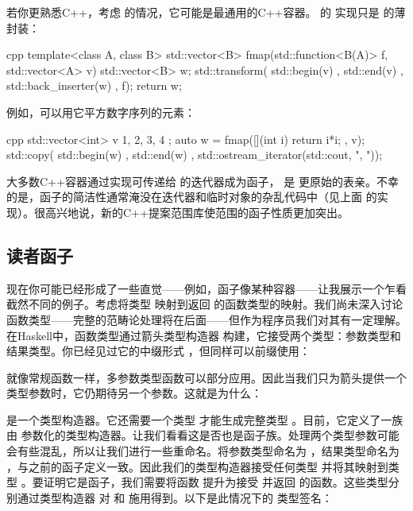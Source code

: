 若你更熟悉C++，考虑  的情况，它可能是最通用的C++容器。 的  实现只是  的薄封装：

\begin{snip}{cpp}
template<class A, class B>
std::vector<B> fmap(std::function<B(A)> f, std::vector<A> v) {
    std::vector<B> w;
    std::transform( std::begin(v)
                  , std::end(v)
                  , std::back_inserter(w)
                  , f);
    return w;
}
\end{snip}
例如，可以用它平方数字序列的元素：

\begin{snip}{cpp}
std::vector<int> v{ 1, 2, 3, 4 };
auto w = fmap([](int i) { return i*i; }, v);
std::copy( std::begin(w)
         , std::end(w)
         , std::ostream_iterator(std::cout, ", "));
\end{snip}
大多数C++容器通过实现可传递给  的迭代器成为函子， 是  更原始的表亲。不幸的是，函子的简洁性通常淹没在迭代器和临时对象的杂乱代码中（见上面  的实现）。很高兴地说，新的C++提案范围库使范围的函子性质更加突出。

\subsection{读者函子}

现在你可能已经形成了一些直觉——例如，函子像某种容器——让我展示一个乍看截然不同的例子。考虑将类型  映射到返回  的函数类型的映射。我们尚未深入讨论函数类型——完整的范畴论处理将在后面——但作为程序员我们对其有一定理解。在Haskell中，函数类型通过箭头类型构造器 \code{(->)} 构建，它接受两个类型：参数类型和结果类型。你已经见过它的中缀形式 ，但同样可以前缀使用：

就像常规函数一样，多参数类型函数可以部分应用。因此当我们只为箭头提供一个类型参数时，它仍期待另一个参数。这就是为什么：

是一个类型构造器。它还需要一个类型  才能生成完整类型 。目前，它定义了一族由  参数化的类型构造器。让我们看看这是否也是函子族。处理两个类型参数可能会有些混乱，所以让我们进行一些重命名。将参数类型命名为 ，结果类型命名为 ，与之前的函子定义一致。因此我们的类型构造器接受任何类型  并将其映射到类型 。要证明它是函子，我们需要将函数  提升为接受  并返回  的函数。这些类型分别通过类型构造器  对  和  施用得到。以下是此情况下的  类型签名：

